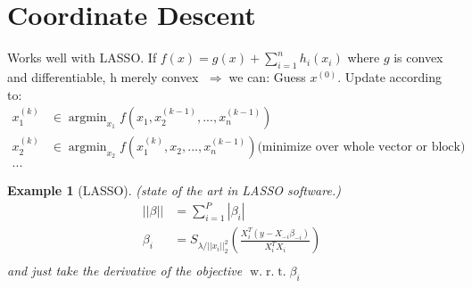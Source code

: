 \documentclass[10pt]{article}
\newtheorem{example}[ex]{Example}
\DeclareMathOperator*{\argmin}{argmin}
\newcommand{\wrt}{\ensuremath{\;\mathrm{w.}\;\mathrm{r.}\;\mathrm{t.}\;}}
\newcommand{\then}{\ensuremath{\;\Rightarrow\;}}
\begin{document}
\section{Coordinate Descent}
Works well with LASSO.%
If $f(x)=g(x)+\sum_{i=1}^nh_i(x_i)$ where $g$ is convex and differentiable, h merely convex
\then we can:
Guess $x^{(0)}$.  Update according to:
\begin{align*}
x_1^{(k)}&\in \argmin_{x_1} f(x_1,x_2^{(k-1)},...,x_n^{(k-1)})\\
x_2^{(k)}&\in \argmin_{x_2} f(x_1^{(k)},x_2,...,x_n^{(k-1)}) \text{(minimize over whole vector or block)}\\
...&
\end{align*}


\begin{example}[LASSO]
  (state of the art in LASSO software.)
  \begin{align*}
    ||\beta||&=\sum_{i=1}^P|\beta_i|\\
    \beta_i&=S_{\lambda/||x_i||_2^2}(\frac{X_i^T(y-X_{-i}\beta_{-i})}{X_i^TX_i})\\
    \end{align*}
  and just take the derivative of the objective \wrt $\beta_i$
\end{example}



\end{document}
